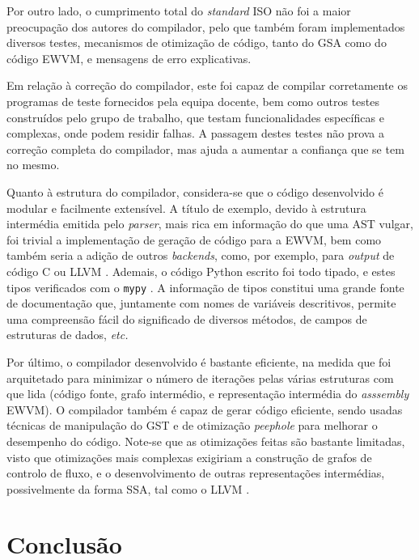 \documentclass[12pt, a4paper]{article}
\begin{document}
Por outro lado, o cumprimento total do \emph{standard} ISO não foi a maior preocupação dos autores
do compilador, pelo que também foram implementados diversos testes, mecanismos de otimização de
código, tanto do GSA como do código EWVM, e mensagens de erro explicativas.

Em relação à correção do compilador, este foi capaz de compilar corretamente os programas de teste
fornecidos pela equipa docente, bem como outros testes construídos pelo grupo de trabalho, que
testam funcionalidades específicas e complexas, onde podem residir falhas. A passagem destes testes
não prova a correção completa do compilador, mas ajuda a aumentar a confiança que se tem no mesmo.

Quanto à estrutura do compilador, considera-se que o código desenvolvido é modular e facilmente
extensível. A título de exemplo, devido à estrutura intermédia emitida pelo \emph{parser}, mais rica
em informação do que uma AST vulgar, foi trivial a implementação de geração de código para a EWVM,
bem como também seria a adição de outros \emph{backends}, como, por exemplo, para \emph{output} de
código C \cite{c} ou LLVM \cite{llvm}. Ademais, o código Python escrito foi todo tipado, e estes
tipos verificados com o \texttt{mypy} \cite{mypy}. A informação de tipos constitui uma grande fonte
de documentação que, juntamente com nomes de variáveis descritivos, permite uma compreensão fácil
do significado de diversos métodos, de campos de estruturas de dados, \emph{etc.}

Por último, o compilador desenvolvido é bastante eficiente, na medida que foi arquitetado para
minimizar o número de iterações pelas várias estruturas com que lida (código fonte, grafo
intermédio, e representação intermédia do \emph{asssembly} EWVM). O compilador também é capaz de
gerar código eficiente, sendo usadas técnicas de manipulação do GST e de otimização \emph{peephole}
para melhorar o desempenho do código. Note-se que as otimizações feitas são bastante limitadas,
visto que otimizações mais complexas exigiriam a construção de grafos de controlo de fluxo, e o
desenvolvimento de outras representações intermédias, possivelmente da forma SSA, tal como o LLVM
\cite{llvm}.

\section{Conclusão}
\end{document}
